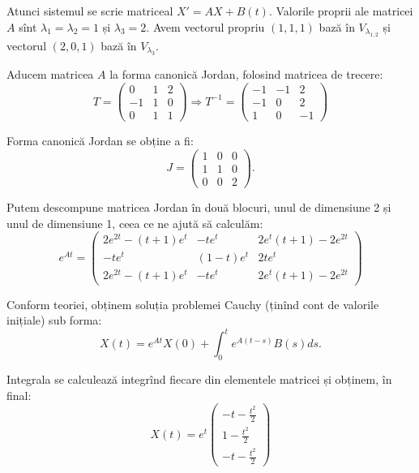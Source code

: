 Atunci sistemul se scrie matriceal $X' = AX + B(t)$. Valorile proprii ale matricei $A$
sînt $\lambda_1 = \lambda_2 = 1$ și $\lambda_3 = 2$. Avem vectorul propriu $(1, 1, 1)$
bază în $V_{\lambda_{1,2}}$ și vectorul $(2, 0, 1)$ bază în $V_{\lambda_3}$.

Aducem matricea $A$ la forma canonică Jordan, folosind matricea de trecere:
\[
  T = \begin{pmatrix}
    0 & 1 & 2 \\
    -1 & 1 & 0 \\
    0 & 1 & 1
  \end{pmatrix} \Rightarrow
  T^{-1} = \begin{pmatrix}
    -1 & -1 & 2 \\
    -1 & 0 & 2 \\
    1 & 0 & -1
  \end{pmatrix}
\]

Forma canonică Jordan se obține a fi:
\[
  J = \begin{pmatrix}
    1 & 0 & 0 \\
    1 & 1 & 0 \\
    0 & 0 & 2
  \end{pmatrix}.
\]

Putem descompune matricea Jordan în două blocuri, unul de dimensiune 2 și unul de
dimensiune 1, ceea ce ne ajută să calculăm:
\[
  e^{At} = \begin{pmatrix}
    2e^{2t} - (t + 1)e^t & -te^t & 2e^t(t + 1) - 2 e^{2t} \\
    -te^t & (1 - t)e^t & 2te^t \\
    2e^{2t} - (t + 1)e^t & -te^t & 2e^t(t + 1) -2e^{2t}
  \end{pmatrix}
\]

Conform teoriei, obținem soluția problemei Cauchy (ținînd cont de valorile inițiale) sub forma:
\[
  X(t) = e^{At} X(0) + \int_0^t e^{A(t-s)} B(s) ds.
\]

Integrala se calculează integrînd fiecare din elementele matricei și obținem, în final:
\[
  X(t) = e^t \begin{pmatrix}
    -t - \frac{t^2}{2} \\
    1 - \frac{t^2}{2} \\
    -t - \frac{t^2}{2}
  \end{pmatrix}
\]

